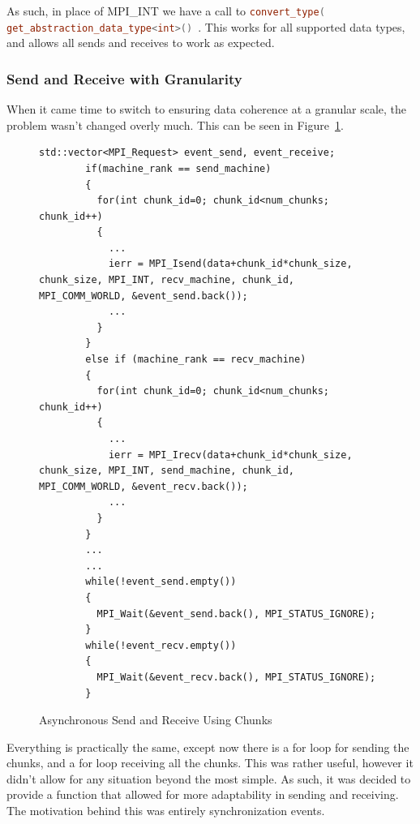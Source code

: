 \documentclass[../thesis.tex]{subfiles}
\begin{document}
    As such, in place of MPI\_INT we have a call to 
    \lstinline[language=cpp]{convert_type( get_abstraction_data_type<int>() }. This works for all supported data types, and allows all sends and receives to work as expected.

  \subsubsection{Send and Receive with Granularity} %
  \label{ssub:send_and_receive_with_granularity}
  
    When it came time to switch to ensuring data coherence at a granular scale, the problem wasn't changed overly much. This can be seen in Figure~\ref{fig:async_send_recv_using_chunks}.

    \begin{figure}[htbp]
      \centering

      \lstset{language=cpp}  
      \begin{lstlisting}[tabsize=2]
        std::vector<MPI_Request> event_send, event_receive;
        if(machine_rank == send_machine)
        {
          for(int chunk_id=0; chunk_id<num_chunks; chunk_id++)
          {
            ...
            ierr = MPI_Isend(data+chunk_id*chunk_size, chunk_size, MPI_INT, recv_machine, chunk_id, MPI_COMM_WORLD, &event_send.back());
            ...
          }
        }
        else if (machine_rank == recv_machine)
        {
          for(int chunk_id=0; chunk_id<num_chunks; chunk_id++)
          {
            ...
            ierr = MPI_Irecv(data+chunk_id*chunk_size, chunk_size, MPI_INT, send_machine, chunk_id, MPI_COMM_WORLD, &event_recv.back());
            ...
          }
        }
        ...
        ...
        while(!event_send.empty())
        {
          MPI_Wait(&event_send.back(), MPI_STATUS_IGNORE);
        }
        while(!event_recv.empty())
        {
          MPI_Wait(&event_recv.back(), MPI_STATUS_IGNORE);
        }

        \end{lstlisting}

      \caption{Asynchronous Send and Receive Using Chunks}
      \label{fig:async_send_recv_using_chunks}
    \end{figure}

    Everything is practically the same, except now there is a for loop for sending the chunks, and a for loop receiving all the chunks. This was rather useful, however it didn't allow for any situation beyond the most simple. As such, it was decided to provide a function that allowed for more adaptability in sending and receiving. The motivation behind this was entirely synchronization events.
\end{document}
